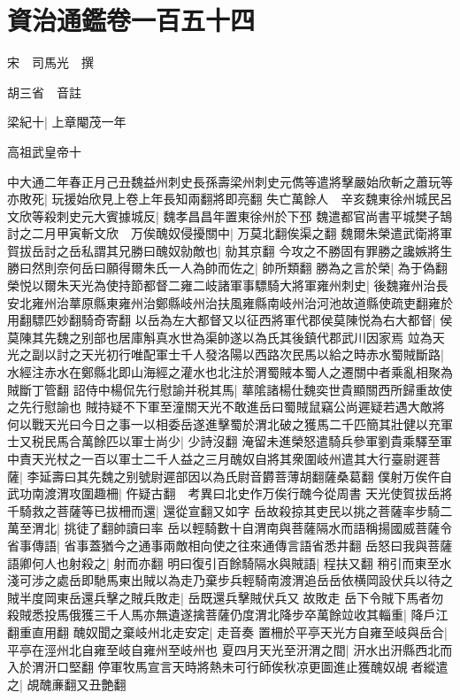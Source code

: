 \chapter{資治通鑑卷一百五十四}
宋　司馬光　撰

胡三省　音註

梁紀十|{
	上章閹茂一年}


高祖武皇帝十

中大通二年春正月己丑魏益州刺史長孫壽梁州刺史元儁等遣將擊嚴始欣斬之蕭玩等亦敗死|{
	玩援始欣見上卷上年長知兩翻將即亮翻}
失亡萬餘人　辛亥魏東徐州城民呂文欣等殺刺史元大賓據城反|{
	魏孝昌昌年置東徐州於下邳}
魏遣都官尚書平城樊子鵠討之二月甲寅斬文欣　万俟醜奴侵擾關中|{
	万莫北翻俟渠之翻}
魏爾朱榮遣武衛將軍賀拔岳討之岳私謂其兄勝曰醜奴勍敵也|{
	勍其京翻}
今攻之不勝固有罪勝之讒嫉將生勝曰然則奈何岳曰願得爾朱氏一人為帥而佐之|{
	帥所類翻}
勝為之言於榮|{
	為于偽翻}
榮悦以爾朱天光為使持節都督二雍二岐諸軍事驃騎大將軍雍州刺史|{
	後魏雍州治長安北雍州治蕐原縣東雍州治鄭縣岐州治扶風雍縣南岐州治河池故道縣使疏吏翻雍於用翻驃匹妙翻騎奇寄翻}
以岳為左大都督又以征西將軍代郡侯莫陳悦為右大都督|{
	侯莫陳其先魏之别部也居庫斛真水世為渠帥遂以為氏其後鎮代郡武川因家焉}
竝為天光之副以討之天光初行唯配軍士千人發洛陽以西路次民馬以給之時赤水蜀賊斷路|{
	水經注赤水在鄭縣北即山海經之灌水也北注於渭蜀賊本蜀人之遷關中者乘亂相聚為賊斷丁管翻}
詔侍中楊侃先行慰諭并税其馬|{
	蕐隂諸楊仕魏奕世貴顯關西所歸重故使之先行慰諭也}
賊持疑不下軍至潼關天光不敢進岳曰蜀賊鼠竊公尚遲疑若遇大敵將何以戰天光曰今日之事一以相委岳遂進擊蜀於渭北破之獲馬二千匹簡其壯健以充軍士又税民馬合萬餘匹以軍士尚少|{
	少詩沒翻}
淹留未進榮怒遣騎兵參軍劉貴乘驛至軍中責天光杖之一百以軍士二千人益之三月醜奴自將其衆圍岐州遣其大行臺尉遲菩薩|{
	李延壽曰其先魏之别號尉遲部因以為氏尉音欝菩薄胡翻薩桑葛翻}
僕射万俟仵自武功南渡渭攻圍趣柵|{
	仵疑古翻　考異曰北史作万俟行醜今從周書}
天光使賀拔岳將千騎救之菩薩等已拔柵而還|{
	還從宣翻又如字}
岳故殺掠其吏民以挑之菩薩率步騎二萬至渭北|{
	挑徒了翻帥讀曰率}
岳以輕騎數十自渭南與菩薩隔水而語稱揚國威菩薩令省事傳語|{
	省事蓋猶今之通事兩敵相向使之往來通傳言語省悉井翻}
岳怒曰我與菩薩語卿何人也射殺之|{
	射而亦翻}
明曰復引百餘騎隔水與賊語|{
	程扶又翻}
稍引而東至水淺可涉之處岳即馳馬東出賊以為走乃棄步兵輕騎南渡渭追岳岳依横岡設伏兵以待之賊半度岡東岳還兵擊之賊兵敗走|{
	岳既還兵擊賊伏兵又故敗走}
岳下令賊下馬者勿殺賊悉投馬俄獲三千人馬亦無遺遂擒菩薩仍度渭北降步卒萬餘竝收其輜重|{
	降戶江翻重直用翻}
醜奴聞之棄岐州北走安定|{
	走音奏}
置柵於平亭天光方自雍至岐與岳合|{
	平亭在涇州北自雍至岐自雍州至岐州也}
夏四月天光至汧渭之間|{
	汧水出汧縣西北而入於渭汧口堅翻}
停軍牧馬宣言天時將熱未可行師俟秋凉更圖進止獲醜奴覘者縱遣之|{
	覘醜亷翻又丑艶翻}
